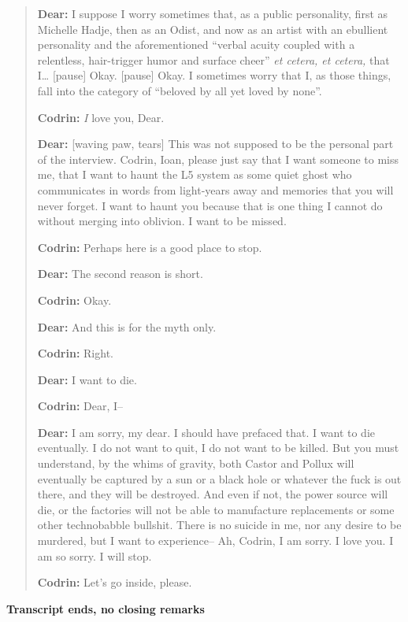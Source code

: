 \begin{quote}
\textbf{Dear:} I suppose I worry sometimes that, as a public personality, first as Michelle Hadje, then as an Odist, and now as an artist with an ebullient personality and the aforementioned ``verbal acuity coupled with a relentless, hair-trigger humor and surface cheer'' \emph{et cetera, et cetera,} that I\ldots{} {[}pause{]} Okay. {[}pause{]} Okay. I sometimes worry that I, as those things, fall into the category of ``beloved by all yet loved by none''.

\textbf{Codrin:} \emph{I} love you, Dear.

\textbf{Dear:} {[}waving paw, tears{]} This was not supposed to be the personal part of the interview. Codrin, Ioan, please just say that I want someone to miss me, that I want to haunt the L5 system as some quiet ghost who communicates in words from light-years away and memories that you will never forget. I want to haunt you because that is one thing I cannot do without merging into oblivion. I want to be missed.

\textbf{Codrin:} Perhaps here is a good place to stop.

\textbf{Dear:} The second reason is short.

\textbf{Codrin:} Okay.

\textbf{Dear:} And this is for the myth only.

\textbf{Codrin:} Right.

\textbf{Dear:} I want to die.

\textbf{Codrin:} Dear, I--

\textbf{Dear:} I am sorry, my dear. I should have prefaced that. I want to die eventually. I do not want to quit, I do not want to be killed. But you must understand, by the whims of gravity, both Castor and Pollux will eventually be captured by a sun or a black hole or whatever the fuck is out there, and they will be destroyed. And even if not, the power source will die, or the factories will not be able to manufacture replacements or some other technobabble bullshit. There is no suicide in me, nor any desire to be murdered, but I want to experience-- Ah, Codrin, I am sorry. I love you. I am so sorry. I will stop.

\textbf{Codrin:} Let's go inside, please.
\end{quote}

\textbf{Transcript ends, no closing remarks}
